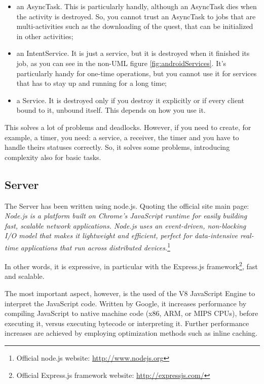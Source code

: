 \begin{itemize}
	\item an AsyncTask. This is particularly handly, although an AsyncTask dies when the activity is destroyed. So, you cannot trust an AsyncTask to jobs that are multi-activities such as the downloading of the quest, that can be initialized in other activities;
	\item an IntentService. It is just a service, but it is destroyed when it finished its job, as you can see in the non-UML figure \ref{fig:androidServices}. It's particularly handy for one-time operations, but you cannot use it for services that has to stay up and running for a long time;
	\item a Service. It is destroyed only if you destroy it explicitly or if every client bound to it, unbound itself. This depends on how you use it.
\end{itemize}

This solves a lot of problems and deadlocks. However, if you need to create, for example, a timer, you need: a service, a receiver, the timer and you have to handle theirs statuses correctly. So, it solves some problems, introducing complexity also for basic tasks.

\subsection{Server}

The Server has been written using node.js. Quoting the official site main page: \textit{Node.js is a platform built on Chrome's JavaScript runtime for easily building fast, scalable network applications. Node.js uses an event-driven, non-blocking I/O model that makes it lightweight and efficient, perfect for data-intensive real-time applications that run across distributed devices.}\footnote{ Official node.js website: \url{http://www.nodejs.org}}

In other words, it is expressive, in particular with the Express.js framework\footnote{Official Express.js framework website: \url{http://expressjs.com/}}, fast and scalable. 

The most important aspect, however, is the used of the V8 JavaScript Engine to interpret the JavaScript code. Written by Google, it increases performance by compiling JavaScript to native machine code (x86, ARM, or MIPS CPUs)\cite{website:v8-intro}, before executing it, versus executing bytecode or interpreting it. Further performance increases are achieved by employing optimization methods such as inline caching.

